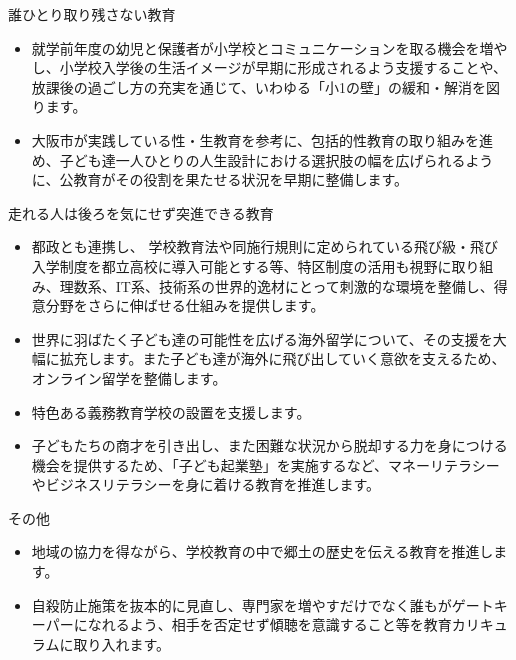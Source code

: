 \documentclass[dvipdfmx]{beamer}
\begin{document}
    \begin{frame}{誰ひとり取り残さない教育}{}
        \begin{small}
            \begin{itemize}
                \setlength{\itemsep}{2mm}
                \item 就学前年度の幼児と保護者が小学校とコミュニケーションを取る機会を増やし、小学校入学後の生活イメージが早期に形成されるよう支援することや、放課後の過ごし方の充実を通じて、いわゆる「小1の壁」の緩和・解消を図ります。
                \item 大阪市が実践している性・生教育を参考に、包括的性教育の取り組みを進め、子ども達一人ひとりの人生設計における選択肢の幅を広げられるように、公教育がその役割を果たせる状況を早期に整備します。
            \end{itemize}
        \end{small}
    \end{frame}

    \begin{frame}{走れる人は後ろを気にせず突進できる教育}{}
        \begin{small}
            \begin{itemize}
                \setlength{\itemsep}{2mm}
                \item 都政とも連携し、 学校教育法や同施行規則に定められている飛び級・飛び入学制度を都立高校に導入可能とする等、特区制度の活用も視野に取り組み、理数系、IT系、技術系の世界的逸材にとって刺激的な環境を整備し、得意分野をさらに伸ばせる仕組みを提供します。
                \item 世界に羽ばたく子ども達の可能性を広げる海外留学について、その支援を大幅に拡充します。また子ども達が海外に飛び出していく意欲を支えるため、オンライン留学を整備します。
                \item 特色ある義務教育学校の設置を支援します。
                \item 子どもたちの商才を引き出し、また困難な状況から脱却する力を身につける機会を提供するため、「子ども起業塾」を実施するなど、マネーリテラシーやビジネスリテラシーを身に着ける教育を推進します。
            \end{itemize}
        \end{small}
    \end{frame}

    \begin{frame}{その他}{}
        \begin{small}
            \begin{itemize}
                \setlength{\itemsep}{2mm}
                \item 地域の協力を得ながら、学校教育の中で郷土の歴史を伝える教育を推進します。
                \item 自殺防止施策を抜本的に見直し、専門家を増やすだけでなく誰もがゲートキーパーになれるよう、相手を否定せず傾聴を意識すること等を教育カリキュラムに取り入れます。
            \end{itemize}
        \end{small}
    \end{frame}
\end{document}
